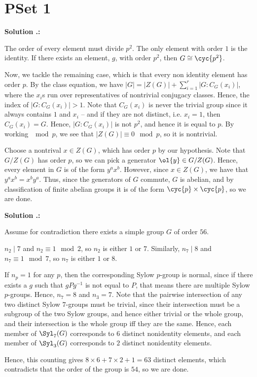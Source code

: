\documentclass[12pt]{scrartcl}
\newcounter{soln}[section]
\renewcommand{\thesoln}{\thesection.\arabic{soln}}
\renewenvironment{soln}
  {\refstepcounter{soln}%
   \begin{mdframed}[style=mdplainbox]\noindent\textbf{Solution \thesoln:}\par\smallskip\ignorespacesafterend}
  {\end{mdframed}}
\begin{document}
\newpage 

\section{PSet 1}
\begin{soln}[Exercise 3]
The order of every element must divide $p^2$.
The only element with order $1$ is the identity.
If there exists an element, $g$, with order $p^2$, then $G \cong \cyc{p^2}$.

Now, we tackle the remaining case, which is that every non identity element has order $p$.
By the class equation, we have $|G| = |Z(G)| + \sum_{i=1}^r |G : C_G(x_i)|$, where the $x_i$s run over representatives of nontrivial conjugacy classes.
Hence, the index of $|G: C_G(x_i)| > 1$.
Note that $C_G(x_i)$ is never the trivial group since it always contains $1$ and $x_i$ – and if they are not distinct, i.e. $x_i = 1$, then $C_G(x_i) = G$.
Hence, $|G : C_G(x_i)|$ is not $p^2$, and hence it is equal to $p$. 
By working $\mod p$, we see that $|Z(G)| \equiv 0 \mod p$, so it is nontrivial.

Choose a nontrival $x \in Z(G)$, which has order $p$ by our hypothesis.
Note that $G/Z(G)$ has order $p$, so we can pick a generator $\ol{y} \in G/Z(G)$.
Hence, every element in $G$ is of the form $y^ax^b$.
However, since $x \in Z(G)$, we have that $y^a x^b = x^by^a$.
Thus, since the generators of $G$ commute, $G$ is abelian, and by classification of finite abelian groups it is of the form $\cyc{p}\times \cyc{p}$, so we are done.
\end{soln}

\begin{soln}[Exercise 5]
Assume for contradiction there exists a simple group $G$ of order $56$.

$n_2 \mid 7$ and $n_2 \equiv 1 \mod 2$, so $n_2$ is either $1$ or $7$.
Similarly, $n_7 \mid 8$ and $n_7 \equiv 1 \mod 7$, so $n_7$ is either $1$ or $8$.

If $n_p = 1$ for any $p$, then the corresponding Sylow $p$-group is normal, since if there exists a $g$ such that $gPg^{-1}$ is not equal to $P$, that means there are multiple Sylow $p$-groups.
Hence, $n_7 = 8$ and $n_3 = 7$.
Note that the pairwise intersection of any two distinct Sylow $7$-groups must be trivial, since their intersection must be a subgroup of the two Sylow groups, and hence either trivial or the whole group, and their intersection is the whole group iff they are the same.
Hence, each member of $\Syl_7(G)$ corresponds to $6$ distinct nonidentity elements, and each member of $\Syl_3(G)$ corresponds to $2$ distinct nonidentity elements.

Hence, this counting gives $8 \times 6 + 7 \times 2 + 1 = 63$ distinct elements, which contradicts that the order of the group is $54$, so we are done.
\end{soln}
\end{document}
